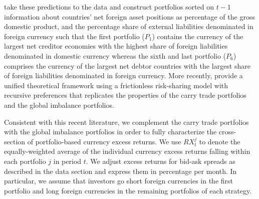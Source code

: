 \citet{dellacorte_etal2015} take these predictions to the data and construct portfolios sorted on $t-1$ information about countries' net foreign asset positions as percentage of the gross domestic product, and the percentage share of external liabilities denominated in foreign currency such that the first portfolio ($P_1$) contains the currency of the largest net creditor economies with the highest share of foreign liabilities denominated in domestic currency whereas the sixth and last portfolio ($P_6$) comprises the currency of the largest net debtor countries with the largest share of foreign liabilities denominated in foreign currency. More recently, \citet{colacito_etal2015} provide a unified theoretical framework using a frictionless risk-sharing model with recursive preferences that replicates the properties of the carry trade portfolios and the global imbalance portfolios.

Consistent with this recent literature, we complement the carry trade portfolios with the global imbalance portfolios in order to fully characterize the cross-section of portfolio-based currency excess returns. We use $RX_t^j$ to denote the equally-weighted average of the individual currency excess returns falling within each portfolio $j$ in period $t$. We adjust excess returns for bid-ask spreads as described in the data section and express them in percentage per month. In particular, we assume that investors go short foreign currencies in the first portfolio and long foreign currencies in the remaining portfolios of each strategy.


